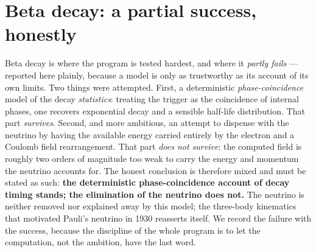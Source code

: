 \section{Beta decay: a partial success, honestly}\label{sec:beta-decay}

Beta decay is where the program is tested hardest, and where it \emph{partly fails} --- reported here plainly,
because a model is only as trustworthy as its account of its own limits. Two things were attempted. First, a
deterministic \emph{phase-coincidence} model of the decay \emph{statistics}: treating the trigger as the
coincidence of internal phases, one recovers exponential decay and a sensible half-life distribution. That part
\emph{survives}. Second, and more ambitious, an attempt to dispense with the neutrino by having the available
energy carried entirely by the electron and a Coulomb field rearrangement. That part \emph{does not survive}: the
computed field is roughly two orders of magnitude too weak to carry the energy and momentum the neutrino accounts
for. The honest conclusion is therefore mixed and must be stated as such: \textbf{the deterministic
phase-coincidence account of decay timing stands; the elimination of the neutrino does not.} The neutrino is
neither removed nor explained away by this model; the three-body kinematics that motivated Pauli's neutrino in
1930 reasserts itself. We record the failure with the success, because the discipline of the whole program is to
let the computation, not the ambition, have the last word.
